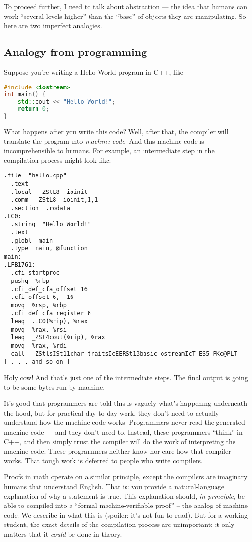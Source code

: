 \documentclass[11pt]{scrartcl}
\begin{document}
To proceed further, I need to talk about abstraction ---
the idea that humans can work ``several levels higher''
than the ``base'' of objects they are manipulating.
So here are two imperfect analogies.

\subsection{Analogy from programming}
Suppose you're writing a Hello World program in C++, like
\begin{lstlisting}[language=C++,basicstyle=\small\ttfamily]
#include <iostream>
int main() {
    std::cout << "Hello World!";
    return 0;
}
\end{lstlisting}
What happens after you write this code?
Well, after that, the compiler will translate the
program into \emph{machine code}.
And this machine code is incomprehensible to humans.
For example, an intermediate step in the compilation process might look like:
\begin{lstlisting}[basicstyle=\scriptsize\ttfamily]
  .file  "hello.cpp"
  .text
  .local  _ZStL8__ioinit
  .comm  _ZStL8__ioinit,1,1
  .section  .rodata
.LC0:
  .string  "Hello World!"
  .text
  .globl  main
  .type  main, @function
main:
.LFB1761:
  .cfi_startproc
  pushq  %rbp
  .cfi_def_cfa_offset 16
  .cfi_offset 6, -16
  movq  %rsp, %rbp
  .cfi_def_cfa_register 6
  leaq  .LC0(%rip), %rax
  movq  %rax, %rsi
  leaq  _ZSt4cout(%rip), %rax
  movq  %rax, %rdi
  call  _ZStlsISt11char_traitsIcEERSt13basic_ostreamIcT_ES5_PKc@PLT
[ . . . and so on ]
\end{lstlisting}
Holy cow! And that's just one of the intermediate steps.
The final output is going to be some bytes run by machine.

It's good that programmers are told this is vaguely what's happening
underneath the hood, but for practical day-to-day work,
they don't need to actually understand how the machine code works.
Programmers never read the generated machine code --- and they don't need to.
\alert{Instead, these programmers ``think'' in C++, and then simply trust
the compiler will do the work of interpreting the machine code.}
These programmers neither know nor care how that compiler works.
That tough work is deferred to people who write compilers.

\alert{Proofs in math operate on a similar principle,
except the compilers are imaginary humans that understand English.}
That is: you provide a natural-language explanation of why a statement is true.
This explanation should, \emph{in principle},
be able to compiled into a ``formal machine-verifiable proof''
-- the analog of machine code.
We describe in  what this is (spoiler: it's not fun to read).
But for a working student, the exact details of the compilation process
are unimportant; it only matters that it \emph{could} be done in theory.
\end{document}
